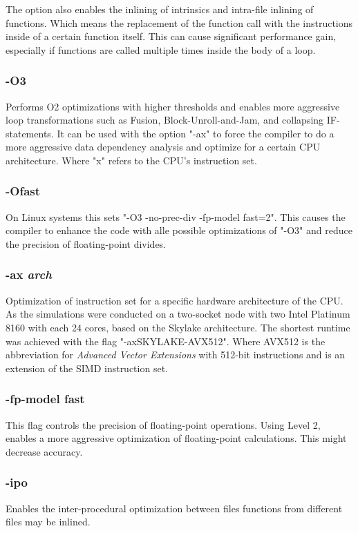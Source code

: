The option also enables the inlining of intrinsics and intra-file inlining of functions. Which means the replacement of the function call with the instructions inside of a certain function itself. This can cause significant performance gain, especially if functions are called multiple times inside the body of a loop.

\subsubsection*{-O3}
Performs O2 optimizations with higher thresholds and enables more aggressive loop transformations such as Fusion, Block-Unroll-and-Jam, and collapsing IF-statements. It can be used with the option "-ax" to force the compiler to do a more aggressive data dependency analysis and optimize for a certain CPU architecture. Where "x" refers to the CPU's instruction set.

\subsubsection*{-Ofast}
On Linux systems this sets "-O3 -no-prec-div -fp-model fast=2". This causes the compiler to enhance the code with alle possible optimizations of "-O3" and reduce the precision of floating-point divides.

\subsubsection*{-ax \textit{arch}}
Optimization of instruction set for a specific hardware architecture of the CPU. As the simulations were conducted on a two-socket node with two Intel Platinum 8160 with each 24 cores, based on the Skylake architecture. The shortest runtime was achieved with the flag "-axSKYLAKE-AVX512". Where AVX512 is the abbreviation for \textit{Advanced Vector Extensions} with 512-bit instructions and is an extension of the SIMD instruction set. 

\subsubsection*{-fp-model fast}
This flag controls the precision of floating-point operations. Using Level 2, enables a more aggressive optimization of floating-point calculations. This might decrease accuracy.

\subsubsection*{-ipo}
Enables the inter-procedural optimization between files functions from different files may be inlined.

